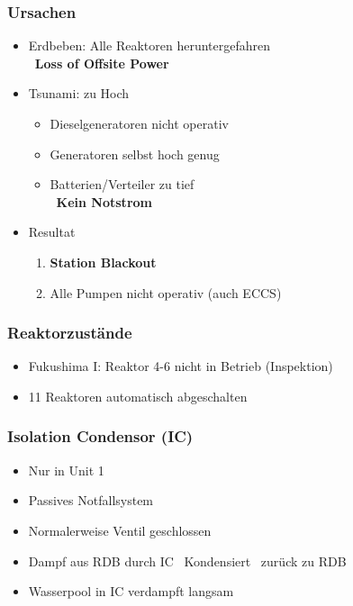 \documentclass[12pt]{article}
\begin{document}
\subsubsection{Ursachen}
\begin{itemize}
	\item Erdbeben: Alle Reaktoren heruntergefahren\\
		\textrightarrow\ \textbf{Loss of Offsite Power}
	\item Tsunami: zu Hoch
		\begin{itemize}
			\item Dieselgeneratoren nicht operativ
			\item Generatoren selbst hoch genug
			\item Batterien/Verteiler zu tief\\
				\textrightarrow\ \textbf{Kein Notstrom}
		\end{itemize}
	\item Resultat
		\begin{enumerate}[label = \textrightarrow]
			\item \textbf{Station Blackout}
			\item Alle Pumpen nicht operativ (auch ECCS)
		\end{enumerate}
\end{itemize}

\subsubsection{Reaktorzustände}
\begin{itemize}
	\item Fukushima I: Reaktor 4-6 nicht in Betrieb (Inspektion)
	\item 11 Reaktoren automatisch abgeschalten
\end{itemize}

\subsubsection{Isolation Condensor (IC)}
\begin{itemize}
	\item Nur in Unit 1
	\item Passives Notfallsystem
	\item Normalerweise Ventil geschlossen
	\item Dampf aus RDB durch IC \textrightarrow\ Kondensiert \textrightarrow\ zurück zu RDB
	\item Wasserpool in IC verdampft langsam
\end{itemize}
\end{document}
